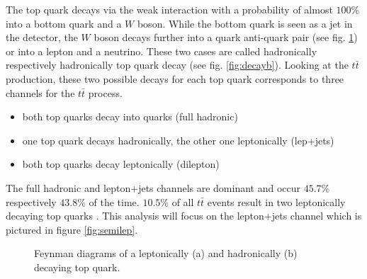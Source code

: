 	The top quark decays via the weak interaction with a probability of almost $100\%$ into a bottom quark and a $W$ boson. While the bottom quark is seen as a jet in the detector, the $W$ boson decays further into a quark anti-quark pair (see fig. \ref{fig:decaya}) or into a lepton and a neutrino. These two cases are called hadronically respectively hadronically top quark decay (see fig. \ref{fig:decayb}). Looking at the $t\bar{t}$ production, these two possible decays for each top quark corresponds to three channels for the $t\bar{t}$ process. 
	\begin{itemize}
	\item both top quarks decay into quarks (full hadronic)
	\item one top quark decays hadronically, the other one leptonically (lep+jets)
	\item both top quarks decay leptonically (dilepton)
	\end{itemize}
	The full hadronic and lepton+jets channels are dominant and occur $45.7\%$ respectively $43.8\%$ of the time. $10.5\%$ of all $t\bar{t}$ events result in two leptonically decaying top quarks \cite{pdg2016}. This analysis will focus on the lepton+jets channel which is pictured in figure \ref{fig:semilep}.
	\begin{figure}
	\begin{subfigure}{.5\textwidth}
		\caption{}
		\label{fig:decaya}
	\end{subfigure}
	\begin{subfigure}{.5\textwidth}
		\caption{}
	\end{subfigure}
	\caption{Feynman diagrams \cite{feynman} of a leptonically (a) and hadronically (b) decaying top quark.}
	\label{fig:decay}
	\end{figure}
	
